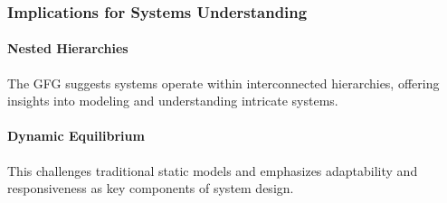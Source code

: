 \documentclass[sn-nature]{sn-jnl}%
\theoremstyle{thmstyleone}%
\theoremstyle{thmstyletwo}%
\theoremstyle{thmstylethree}%
\begin{document}
\subsubsection{Implications for Systems Understanding}

\paragraph{Nested Hierarchies}
The GFG suggests systems operate within interconnected hierarchies, offering insights into modeling and understanding intricate systems\cite{ujwary-gil_organizational_2020}.
\paragraph{Dynamic Equilibrium} This challenges traditional static models and emphasizes adaptability and responsiveness as key components of system design\cite{holland_hidden_1996}.
\end{document}
